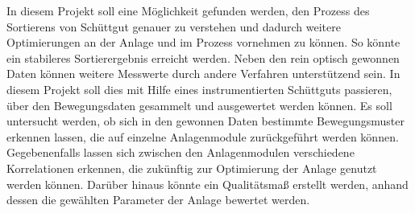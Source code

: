 In diesem Projekt soll eine Möglichkeit gefunden werden, den Prozess des Sortierens von Schüttgut genauer zu verstehen und dadurch weitere Optimierungen an der Anlage und im Prozess vornehmen zu können. So könnte ein stabileres Sortierergebnis erreicht werden. Neben den rein optisch gewonnen Daten können weitere Messwerte durch andere Verfahren unterstützend sein. In diesem Projekt soll dies mit Hilfe eines instrumentierten Schüttguts passieren, über den Bewegungsdaten gesammelt und ausgewertet werden können. Es soll untersucht werden, ob sich in den gewonnen Daten bestimmte Bewegungsmuster erkennen lassen, die auf einzelne Anlagenmodule zurückgeführt werden können. Gegebenenfalls lassen sich zwischen den Anlagenmodulen verschiedene Korrelationen erkennen, die zukünftig zur Optimierung der Anlage genutzt werden können. Darüber hinaus könnte ein Qualitätsmaß erstellt werden, anhand dessen die gewählten Parameter der Anlage bewertet werden.

